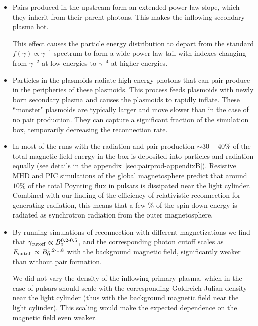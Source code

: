 \begin{itemize}[leftmargin=*,wide = 0pt]
    \item Pairs produced in the upstream form an extended power-law slope, which they inherit from their parent photons. This makes the inflowing secondary plasma hot.

    This effect causes the particle energy distribution to depart from the standard $f(\gamma)\propto \gamma^{-1}$ spectrum to form a wide power law tail with indexes changing from $\gamma^{-2}$ at low energies to $\gamma^{-4}$ at higher energies.
\end{itemize}

\begin{itemize}[leftmargin=*,wide = 0pt]
    \item Particles in the plasmoids radiate high energy photons that can pair produce in the peripheries of these plasmoids. This process feeds plasmoids with newly born secondary plasma and causes the plasmoids to rapidly inflate. These ``monster" plasmoids are typically larger and move slower than in the case of no pair production. They can capture a significant fraction of the simulation box, temporarily decreasing the reconnection rate.
\end{itemize}

\begin{itemize}[leftmargin=*,wide = 0pt]
    \item In most of the runs with the radiation and pair production $\sim30-40\%$ of the total magnetic field energy in the box is deposited into particles and radiation equally (see details in the appendix~\ref{sec:pairprod-appendixB}). Resistive MHD \citep{2012ApJ...749....2K} and PIC \citep{2014ApJ...785L..33P} simulations of the global magnetosphere predict that around $10\%$ of the total Poynting flux in pulsars is dissipated near the light cylinder. Combined with our finding of the efficiency of relativistic reconnection for generating radiation, this means that a few $\%$ of the spin-down energy is radiated as synchrotron radiation from the outer magnetosphere.
\end{itemize}

\begin{itemize}[leftmargin=*,wide = 0pt]
    \item By running simulations of reconnection with different magnetizations we find that $\gamma_{\rm cutoff}\propto B_0^{0.2\text{-}0.5}$, and the corresponding photon cutoff scales as $E_{\rm cutoff}\propto B_0^{1.2\text{-}1.8}$ with the background magnetic field, significantly weaker than without pair formation.

    We did not vary the density of the inflowing primary plasma, which in the case of pulsars should scale with the corresponding Goldreich-Julian density near the light cylinder (thus with the background magnetic field near the light cylinder). This scaling would make the expected dependence on the magnetic field even weaker.
\end{itemize}

